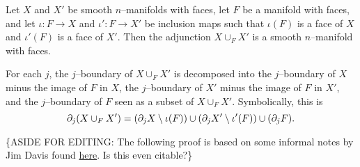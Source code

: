 \begin{prop}
	\label{prop:addface}
	Let $X$ and $X'$ be smooth $n$--manifolds with faces, let $F$ be a manifold with faces, and let $\iota:F\to X$ and $\iota':F\to X'$ be inclusion maps such that $\iota(F)$ is a face of $X$ and $\iota'(F)$ is a face of $X'$.
	Then the adjunction $X\cup_F X'$ is a smooth $n$--manifold with faces.
	
	For each $j$, the $j$--boundary of $X\cup_F X'$ is decomposed into the $j$--boundary of $X$ minus the image of $F$ in $X$, the $j$--boundary of $X'$ minus the image of $F$ in $X'$, and the $j$--boundary of $F$ seen as a subset of $X\cup_F X'$.
	Symbolically, this is $$\partial_j( X \cup_F X') = (\partial_j X\setminus \iota(F))\cup(\partial_j X'\setminus \iota'(F))\cup(\partial_j F).$$
\end{prop}

\{ASIDE FOR EDITING:  The following proof is based on some informal notes by Jim Davis found \href{http://www.indiana.edu/~jfdavis/notes/m623/smooth_structures_and_handles.pdf}{here}. Is this even citable?\}

